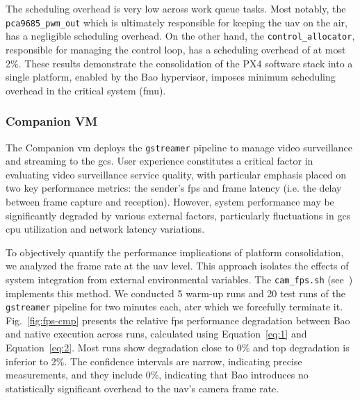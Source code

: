 The scheduling overhead is very low across work queue tasks. Most notably,
the \lstinline{pca9685_pwm_out} which is ultimately responsible for keeping the
\gls{uav} on the air, has a negligible scheduling overhead. On the other hand,
the \lstinline{control_allocator}, responsible for managing the control loop,
has a scheduling overhead of at most 2\%. These results demonstrate the
consolidation of the PX4 software stack into a single platform, enabled by the
Bao hypervisor, imposes minimum scheduling overhead in the critical system
(\gls{fmu}).

\subsubsection{Companion VM}
\label{sec:companion-vm}
The Companion \gls{vm} deploys the \lstinline{gstreamer} pipeline to manage
video surveillance and streaming to the \gls{gcs}. User experience constitutes a
critical factor in evaluating video surveillance service quality, with
particular emphasis placed on two key performance metrics: the sender's
\gls{fps} and frame latency (i.e. the delay between frame capture and
reception). However, system performance
may be significantly degraded by various external factors, particularly
fluctuations in \gls{gcs} \gls{cpu} utilization and network latency variations.

To objectively quantify the performance implications of platform consolidation,
we analyzed the frame rate at the \gls{uav} level. This approach isolates the
effects of system integration from external environmental variables. The
\lstinline{cam_fps.sh} (see~\cite{thesis-sw-github}) implements this method. We
conducted 5 warm-up runs and 20 test runs of the \lstinline{gstreamer} pipeline
for two minutes each, ater which we forcefully terminate it.
%
Fig.~\ref{fig:fps-cmp} presents the relative \gls{fps} performance degradation
between Bao and native execution across runs, calculated using Equation~\ref{eq:1} and Equation~\ref{eq:2}. Most runs show
degradation close to 0\% and top degradation is inferior to 2\%. The confidence
intervals are narrow, indicating precise measurements, and they include 0\%,
indicating that Bao introduces no statistically significant overhead to the
\gls{uav}'s camera frame rate.

